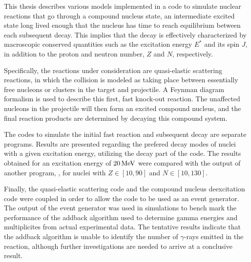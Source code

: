 This thesis describes various models implemented in a code to simulate nuclear reactions that go through a compound nucleus state, an intermediate excited state long lived enough that the nucleus has time to reach equilibrium between each subsequent decay. This implies that the decay is effectively characterized by macroscopic conserved quantities such as the excitation energy $E^*$ and its spin $J$, in addition to the proton and neutron number, $Z$ and $N$, respectively.

Specifically, the reactions under consideration are quasi-elastic scattering reactions, in which the collision is modeled as taking place between essentially free nucleons or clusters in the target and projectile. A Feynman diagram formalism is used to describe this first, fast knock-out reaction.
The unaffected nucleons in the projectile will then form an excited compound nucleus, and the final reaction products are determined by decaying this compound system. 

The codes to simulate the initial fast reaction and subsequent decay are separate programs. Results are presented regarding the prefered decay modes of nuclei with a given excitation energy, utilizing the decay part of the code. The results obtained for an excitation energy of $\unit[20]{MeV}$ were compared with the output of another program, , for nuclei with $Z\in [10,90]$ and $N \in [10,130]$. 

Finally, the quasi-elastic scattering code and the compound nucleus deexcitation code were coupled in order to allow the code to be used as an event generator. The output of the event generator was used in simulations to bench mark the performance of the addback algorithm used to determine gamma energies and multiplicites from actual experimental data. The tentative results indicate that the addback algorithm is unable to identify the number of $\gamma$-rays emitted in the reaction, although further investigations are needed to arrive at a conclusive result.
